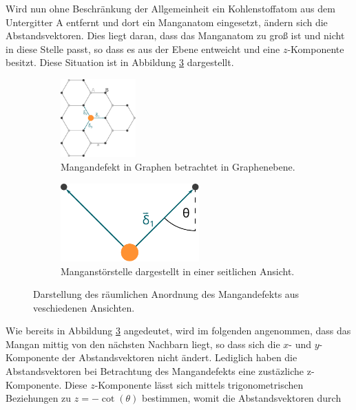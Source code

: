 Wird nun ohne Beschränkung der Allgemeinheit ein Kohlenstoffatom aus dem Untergitter A entfernt und dort ein Manganatom eingesetzt, ändern sich die
Abstandsvektoren. 
Dies liegt daran, dass das Manganatom zu groß ist und nicht in diese Stelle passt, so dass es aus der Ebene entweicht und eine $z$-Komponente besitzt.
Diese Situation ist in Abbildung \ref{fig:mangan_impurity} dargestellt.
\begin{figure}
    \begin{subfigure}{0.48\textwidth}%
    \centering%
    \includegraphics[height=3cm]{Plots/mangan_impurity_inplane.pdf}%
    \caption{Mangandefekt in Graphen betrachtet in Graphenebene.}%
    \label{fig:mangan_impurity_inplane}%
    \end{subfigure}%
    \hfill%
    \begin{subfigure}{0.48\textwidth}%
    \centering%
    \includegraphics[height=3cm]{Plots/mangan_impurity_z_component.pdf}%
    \caption{Manganstörstelle dargestellt in einer seitlichen Ansicht.}%
    \label{fig:mangan_impurity_z_component}%
    \end{subfigure}%
    \caption{Darstellung des räumlichen Anordnung des Mangandefekts aus veschiedenen Ansichten.}%
    \label{fig:mangan_impurity}%
\end{figure}%
Wie bereits in Abbildung \ref{fig:mangan_impurity} angedeutet, wird im folgenden angenommen, dass das Mangan mittig von den nächsten Nachbarn liegt, so dass 
sich die $x$- und $y$-Komponente der Abstandsvektoren nicht ändert.
Lediglich haben die Abstandsvektoren bei Betrachtung des Mangandefekts eine zustäzliche z-Komponente.
Diese $z$-Komponente lässt sich mittels trigonometrischen Beziehungen zu $z = -\cot (\theta)$ bestimmen, womit die 
Abstandsvektoren durch 
